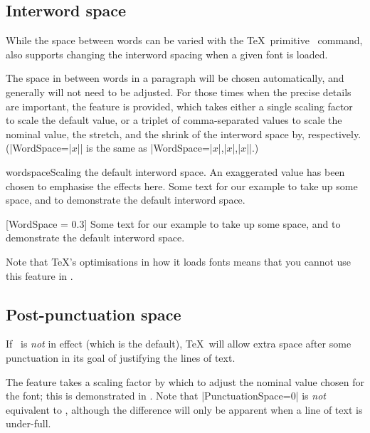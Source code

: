 \documentclass[a4paper]{l3doc}
\begin{document}
\subsection{Interword space}

While the space between words can be varied with the \TeX\ primitive
\cmd\spaceskip\ command,  also supports changing the
interword spacing when a given font is loaded.

The space in between words in a paragraph will be chosen automatically,
and generally will not need to be adjusted. For those
times when the precise details are important, the 
feature is
provided, which takes either a single scaling factor to scale the
default value, or a triplet of comma-separated
values to scale the nominal value, the stretch, and the shrink of the
interword space by, respectively. (|WordSpace={|$x$|}| is the same as
|WordSpace={|$x$|,|$x$|,|$x$|}|.)

\begingroup
\let\centering\relax
\begin{Xexample}{wordspace}{Scaling the default interword space. An exaggerated value has been chosen to emphasise the effects here.}
  Some text for our example to take
  up some space, and to demonstrate
  the default interword space.
  \bigskip

    [WordSpace = 0.3]
  Some text for our example to take
  up some space, and to demonstrate
  the default interword space.
\end{Xexample}
\endgroup

Note that \TeX's optimisations in how it loads fonts means that you cannot
use this feature in .

\subsection{Post-punctuation space}

If \cmd\frenchspacing\ is \emph{not} in effect (which is the default), \TeX\ will allow extra space after some punctuation in its goal of justifying the lines of text.

The  feature takes a scaling factor by which to
adjust the nominal value chosen for the font; this is demonstrated in
.
Note that |PunctuationSpace=0|
is \emph{not} equivalent to \cmd\frenchspacing, although the difference
will only be apparent when a line of text is under-full.
\end{document}
